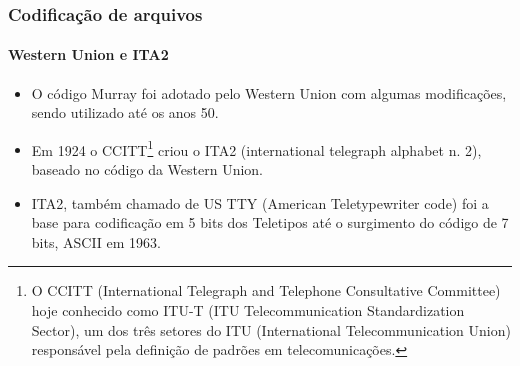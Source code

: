 \begin{frame}
\frametitle{Codificação de arquivos}
\framesubtitle{Western Union e ITA2}
   \begin{itemize}
   \item O código Murray foi adotado pelo Western Union com algumas modificações, sendo utilizado até os anos 50.
   \item Em 1924 o CCITT\footnote{O CCITT (International Telegraph and Telephone Consultative Committee) hoje conhecido
                                 como ITU-T (ITU Telecommunication Standardization Sector), um dos três setores do
                                 ITU (International Telecommunication Union) responsável pela definição de padrões em telecomunicações.}
         criou o ITA2 (international telegraph alphabet n. 2), baseado no código da Western Union.
   \item ITA2, também chamado de US TTY (American Teletypewriter code) foi a base para codificação em 5 bits dos Teletipos
         até o surgimento do código de 7 bits, ASCII em 1963.
   \end{itemize}
\end{frame}


